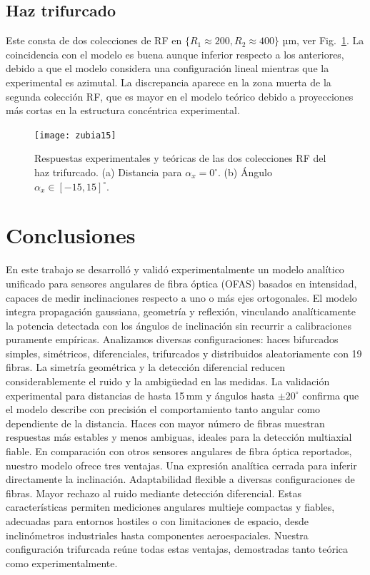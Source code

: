\documentclass[11pt,a4paper]{article}
\begin{document}
\begin{multicols}{2}
\subsection{Haz trifurcado}
Este consta de dos colecciones de RF en $\lbrace R_1 \approx 200,R_2 \approx 400\rbrace$ µm, ver Fig.~\ref{fig:5_15}. La coincidencia con el modelo es buena aunque inferior respecto a los anteriores, debido a que el modelo considera una configuración lineal mientras que la experimental es azimutal. La discrepancia aparece en la zona muerta de la segunda colección RF, que es mayor en el modelo teórico debido a proyecciones más cortas en la estructura concéntrica experimental.
\begin{figure}[H]
    \centering
    \texttt{[image: zubia15]}
    \caption{Respuestas experimentales y teóricas de las dos colecciones RF del haz trifurcado. (a) Distancia para $\alpha_x=0^\circ$. (b) Ángulo $\alpha_x \in [-15,15]^\circ$.}
    \label{fig:5_15}
\end{figure}
%
%
\section{Conclusiones}
En este trabajo se desarrolló y validó experimentalmente un modelo analítico unificado para sensores angulares de fibra óptica (OFAS) basados en intensidad, capaces de medir inclinaciones respecto a uno o más ejes ortogonales. El modelo integra propagación gaussiana, geometría y reflexión, vinculando analíticamente la potencia detectada con los ángulos de inclinación sin recurrir a calibraciones puramente empíricas. Analizamos diversas configuraciones: haces bifurcados simples, simétricos, diferenciales, trifurcados y distribuidos aleatoriamente con 19 fibras. La simetría geométrica y la detección diferencial reducen considerablemente el ruido y la ambigüedad en las medidas. La validación experimental para distancias de hasta 15\,mm y ángulos hasta $\pm20^\circ$ confirma que el modelo describe con precisión el comportamiento tanto angular como dependiente de la distancia. Haces con mayor número de fibras muestran respuestas más estables y menos ambiguas, ideales para la detección multiaxial fiable. En comparación con otros sensores angulares de fibra óptica reportados, nuestro modelo ofrece tres ventajas. Una expresión analítica cerrada para inferir directamente la inclinación. Adaptabilidad flexible a diversas configuraciones de fibras. Mayor rechazo al ruido mediante detección diferencial. Estas características permiten mediciones angulares multieje compactas y fiables, adecuadas para entornos hostiles o con limitaciones de espacio, desde inclinómetros industriales hasta componentes aeroespaciales. Nuestra configuración trifurcada reúne todas estas ventajas, demostradas tanto teórica como experimentalmente.


\end{multicols}
\end{document}
